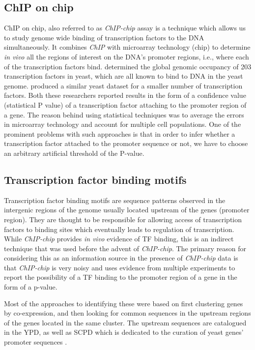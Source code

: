 \subsection{ChIP on chip}

\ac{ChIP} on chip,  also referred to as \textit{ChIP-chip} assay is a technique which allows us to study genome wide binding of transcription factors to the DNA simultaneously. It combines \textit{\ac{ChIP}} with microarray technology (chip) to determine \textit{in vivo} all the regions of interest on the DNA's promoter regions, i.e., where each of the transcription factors bind. \cite{harbison04transcriptional} determined the global genomic occupancy of 203 transcription factors in yeast, which are all known to bind to DNA in the yeast genome. \cite{lee02transcriptional} produced a similar yeast dataset for a smaller number of transcription factors. Both these researchers reported results in the form of a confidence value (statistical P value) of a transcription factor attaching to the promoter region of a gene. The reason behind using statistical techniques was to average the errors in microarray technology and account for multiple cell populations. One of the prominent problems with such approaches is that in order to infer whether a transcription factor attached to the promoter sequence or not, we have to choose an arbitrary artificial threshold of the P-value. 

\subsection{Transcription factor binding motifs}
Transcription factor binding motifs are sequence patterns observed in the intergenic regions of the genome usually located upstream of the genes (promoter region). They are thought to be responsible for allowing access of transcription factors to binding sites which eventually leads to regulation of transcription. While \textit{ChIP-chip} provides \textit{in vivo} evidence of \ac{TF} binding, this is an indirect technique that was used before the advent of \textit{ChIP-chip}. The primary reason for considering this as an information source in the presence of \textit{ChIP-chip} data is that \textit{ChIP-chip} is very noisy and uses evidence from multiple experiments \citep{lee02transcriptional} to report the possibility of a \ac{TF} binding to the promoter region of a gene in the form of a p-value. 

Most of the approaches to identifying these were based on first clustering genes by co-expression, and then looking for common sequences in the upstream regions of the genes located in the same cluster. The upstream sequences are catalogued in the \ac{YPD}, as well as \ac{SCPD} which is dedicated to the curation of yeast genes' promoter sequences \citep{zhu1999scpd}. 

